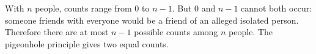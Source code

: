 With $n$ people, counts range from 0 to $n-1$. But 0 and $n-1$ cannot both occur: someone friends with everyone would be a friend of an alleged isolated person. Therefore there are at most $n-1$ possible counts among $n$ people. The pigeonhole principle gives two equal counts.
